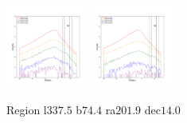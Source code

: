 \documentclass[12pt,prd]{article}
\begin{document}
\begin{figure}[h!]
\includegraphics[width=0.24\textwidth]{../figures/scanning_plotsgaiascan_l337_5_b74_4_ra201_9_dec14_0_npy_16.pdf}
\includegraphics[width=0.24\textwidth]{../figures/scanning_plotsgaiascan_l337_5_b74_4_ra201_9_dec14_0_npy_17.pdf}
\caption{Region l$337.5$ b$74.4$ ra$201.9$ dec$14.0$}
\end{figure}
\end{document}
